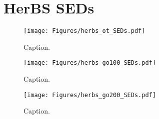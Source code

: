 \chapter{HerBS SEDs}

\begin{figure}
	\centering
	\texttt{[image: Figures/herbs\_ot\_SEDs.pdf]}
	\caption[Caption]{Caption.}
\end{figure}

\begin{figure}
	\centering
	\texttt{[image: Figures/herbs\_go100\_SEDs.pdf]}
	\caption[Caption]{Caption.}
\end{figure}

\begin{figure}
	\centering
	\texttt{[image: Figures/herbs\_go200\_SEDs.pdf]}
	\caption[Caption]{Caption.}
\end{figure}